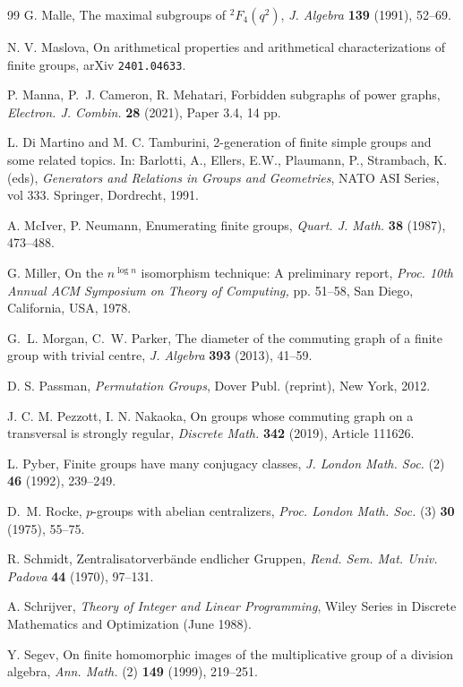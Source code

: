 \documentclass{elsarticle}
\begin{document}
\begin{thebibliography}{99}
G. Malle,
The maximal subgroups of ${}^2F_4(q^2)$,
\textit{J. Algebra} \textbf{139} (1991), 52--69.

N. V. Maslova,
On arithmetical properties and arithmetical characterizations of finite groups,
arXiv \texttt{2401.04633}.

 P. Manna, P.~J. Cameron, R. Mehatari,
Forbidden subgraphs of power graphs,
\textit{Electron. J. Combin.} \textbf{28} (2021),  Paper 3.4, 14 pp.

L. Di Martino and M. C. Tamburini,
2-generation of finite simple groups and some related topics.
In: Barlotti, A., Ellers, E.W., Plaumann, P., Strambach, K. (eds),
\textit{Generators and Relations in Groups and Geometries},
NATO ASI Series, vol 333. Springer, Dordrecht, 1991.

A. McIver, P. Neumann,
Enumerating finite groups,
\textit{Quart. J. Math.} \textbf{38} (1987), 473--488.

 G. Miller,
On the $n^{\log n}$ isomorphism technique: A preliminary report,
\textit{Proc. 10th Annual {ACM} Symposium on Theory of Computing,} pp. 51--58,
San Diego, California, USA, 1978.

G.~L. Morgan, C.~W. Parker,
The diameter of the commuting graph of a finite group with trivial centre,
\textit{J. Algebra} \textbf{393} (2013),  41--59.

D. S. Passman,
\textit{Permutation Groups},
Dover Publ. (reprint), New York, 2012.

J. C. M. Pezzott, I. N. Nakaoka,
On groups whose commuting graph on a transversal is strongly regular,
\textit{Discrete Math.} \textbf{342} (2019), Article 111626.

L. Pyber,
Finite groups have many conjugacy classes,
\textit{J. London Math. Soc.} (2) \textbf{46} (1992), 239--249.

D.~M. Rocke, $p$-groups with abelian centralizers,
\textit{Proc. London Math. Soc.} (3) \textbf{30} (1975), 55--75.

R. Schmidt, Zentralisatorverb\"ande endlicher Gruppen,
\textit{Rend. Sem. Mat. Univ. Padova} \textbf{44} (1970), 97--131.

  A. Schrijver,
  \textit{Theory of Integer and Linear Programming}, Wiley Series in
  Discrete Mathematics and Optimization (June 1988).

Y. Segev,
On finite homomorphic images of the multiplicative group of a division algebra,
\textit{Ann. Math.} (2) \textbf{149} (1999), 219--251.


\end{thebibliography}
\end{document}
